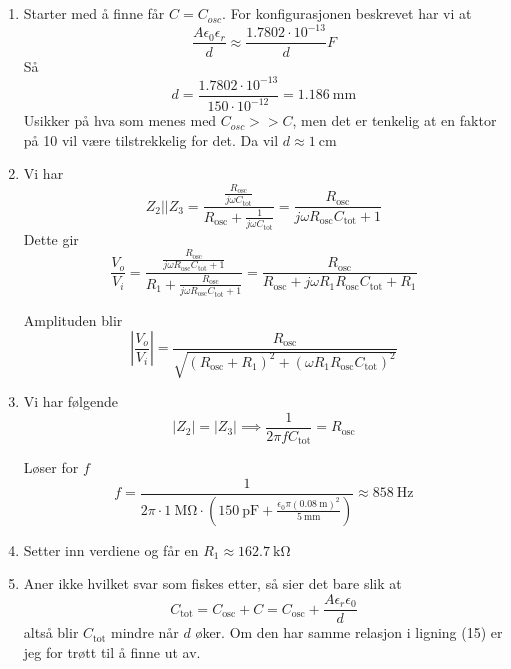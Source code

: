 \documentclass[a4paper,11pt,norsk]{article}
\begin{document}
\subsection{}
\begin{enumerate}
    \item Starter med å finne får $C = C_{osc}$. For konfigurasjonen beskrevet har vi at
        \[
            \frac{A\epsilon_0\epsilon_r}{d} \approx \frac{1.7802 \cdot 10^{-13}}{d} F
        \]
        Så 
        \[
            d = \frac{1.7802 \cdot 10^{-13}}{150 \cdot 10^{-12}} = \SI{1.186}{\milli\meter}
        \]
        Usikker på hva som menes med $C_{osc} >> C$, men det er tenkelig at en faktor på 10 vil være tilstrekkelig for det. Da
        vil $d \approx \SI{1}{\centi\meter}$


    \item Vi har
        \[
            Z_2 || Z_3 = \frac{\frac{R_{\text{osc}}}{j\omega C_{\text{tot}}}}{R_{\text{osc}} + \frac{1}{j\omega C_{\text{tot}}}} = \frac{R_{\text{osc}}}{j\omega R_{\text{osc}} C_{\text{tot}} + 1}
        \]
        Dette gir
        \[
            \frac{V_o}{V_i} = \frac{\frac{R_{\text{osc}}}{j\omega R_{\text{osc}} C_{\text{tot}} + 1}}{R_1 + \frac{R_{\text{osc}}}{j\omega R_{\text{osc}} C_{\text{tot}} + 1}} = \frac{R_{\text{osc}}}{R_{\text{osc}} + j\omega R_1 R_{\text{osc}} C_{\text{tot}} + R_1}
        \]

        Amplituden blir
        \[
            \left|\frac{V_o}{V_i}\right| = \frac{R_{\text{osc}}}{\sqrt{(R_{\text{osc}} + R_1)^2 + (\omega R_1 R_{\text{osc}} C_{\text{tot}})^2}}
        \]

    \item 
        Vi har følgende
        \[
            |Z_2| = |Z_3| \implies \frac{1}{2\pi f C_{\text{tot}}} = R_{\text{osc}}
        \]

        Løser for $f$
        \[
            f = \frac{1}{2\pi \cdot \SI{1}{\mega\ohm} \cdot \left(\SI{150}{\pico\farad} + \frac{\epsilon_0 \pi (\SI{0.08}{\meter})^2}{\SI{5}{\milli\meter}}\right)} \approx \SI{858}{\hertz}
        \]

    \item Setter inn verdiene og får en $R_1 \approx \SI{162.7}{\kilo\ohm}$

    \item Aner ikke hvilket svar som fiskes etter, så sier det bare slik at
        \[
            C_{\text{tot}} = C_{\text{osc}} + C = C_{\text{osc}} + \frac{A\epsilon_r\epsilon_0}{d}
        \]
        altså blir $C_{\text{tot}}$ mindre når $d$ øker. Om den har samme relasjon i ligning (15) er jeg for trøtt til å finne ut av.

\end{enumerate}
\end{document}
